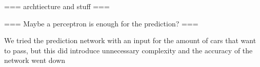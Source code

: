 === archtiecture and stuff ===

=== Maybe a perceptron is enough for the prediction? ===

We tried the prediction network with an input for the amount of cars that want to pass, but this did introduce unnecessary complexity and the accuracy of the network went down